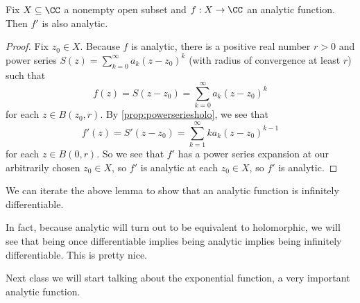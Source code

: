 \begin{lemma}
	Fix $X\subseteq\CC$ a nonempty open subset and $f:X\to\CC$ an analytic function. Then $f'$ is also analytic.
\end{lemma}
\begin{proof}
	Fix $z_0\in X$. Because $f$ is analytic, there is a positive real number $r>0$ and power series $S(z)=\sum_{k=0}^\infty a_k(z-z_0)^k$ (with radius of convergence at least $r$) such that
	\[f(z)=S(z-z_0)=\sum_{k=0}^\infty a_k(z-z_0)^k\]
	for each $z\in B(z_0,r)$. By \autoref{prop:powerseriesholo}, we see that
	\[f'(z)=S'(z-z_0)=\sum_{k=1}^\infty ka_k(z-z_0)^{k-1}\]
	for each $z\in B(0,r)$. So we see that $f'$ has a power series expansion at our arbitrarily chosen $z_0\in X$, so $f'$ is analytic at each $z_0\in X$, so $f'$ is analytic.
\end{proof}
\begin{remark}
	We can iterate the above lemma to show that an analytic function is infinitely differentiable.
\end{remark}
\begin{remark}
	In fact, because analytic will turn out to be equivalent to holomorphic, we will see that being once differentiable implies being analytic implies being infinitely differentiable. This is pretty nice.
\end{remark}
Next class we will start talking about the exponential function, a very important analytic function.